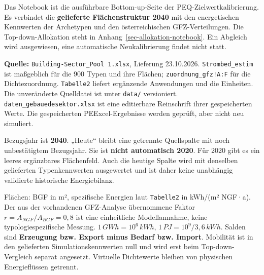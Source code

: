 \documentclass[
  ngerman,
  a4paper,
  DIV=11]{scrreprt}
\begin{document}
Das Notebook ist die ausführbare Bottom-up-Seite der
PEQ-Zielwertkalibrierung. Es verbindet die \textbf{gelieferte
Flächenstruktur 2040} mit den energetischen Kennwerten der Archetypen
und den österreichischen GFZ-Verteilungen. Die Top-down-Allokation steht
in Anhang~\ref{sec-allokation-notebook}. Ein Abgleich wird ausgewiesen,
eine automatische Neukalibrierung findet nicht statt.

\textbf{Quelle:} \texttt{Building-Sector\_Pool\ 1.xlsx}, Lieferung
23.10.2026. \texttt{Strombed\_estim} ist maßgeblich für die 900 Typen
und ihre Flächen; \texttt{zuordnung\_gfz!A:F} für die Dichtezuordnung.
\texttt{Tabelle2} liefert ergänzende Anwendungen und die Einheiten. Die
unveränderte Quelldatei ist unter \texttt{data/} versioniert.
\texttt{daten\_gebauedesektor.xlsx} ist eine editierbare Reinschrift
ihrer gespeicherten Werte. Die gespeicherten PEExcel-Ergebnisse werden
geprüft, aber nicht neu simuliert.

Bezugsjahr ist \textbf{2040}. „Heute`` bleibt eine getrennte Quellspalte
mit noch unbestätigtem Bezugsjahr. Sie ist \textbf{nicht automatisch
2020}. Für 2020 gibt es ein leeres ergänzbares Flächenfeld. Auch die
heutige Spalte wird mit denselben gelieferten Typenkennwerten
ausgewertet und ist daher keine unabhängig validierte historische
Energiebilanz.

Flächen: BGF in m², spezifische Energien laut \texttt{Tabelle2} in
kWh/(m² NGF·a). Der aus der vorhandenen GFZ-Analyse übernommene Faktor
\(r=A_{NGF}/A_{BGF}=0{,}8\) ist eine einheitliche Modellannahme, keine
typologiespezifische Messung. \(1\,GWh=10^6\,kWh\),
\(1\,PJ=10^9/3{,}6\,kWh\). Salden sind \textbf{Erzeugung bzw. Export
minus Bedarf bzw. Import}. Mobilität ist in den gelieferten
Simulationskennwerten null und wird erst beim Top-down-Vergleich separat
angesetzt. Virtuelle Dichtewerte bleiben von physischen Energieflüssen
getrennt.
\end{document}
